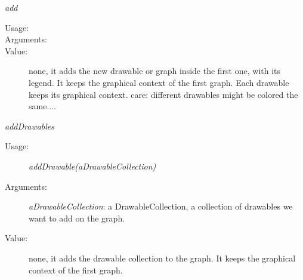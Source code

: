 \begin{description}
\begin{description}
  \item \textit{add}
    \begin{description}
    \item[Usage:] \rule{0pt}{1em}
    \item[Arguments:]  \rule{0pt}{1em}
    \item[Value:] none, it adds the new drawable or graph inside the first one, with its legend. It keeps the graphical context of the first graph. Each drawable keeps its graphical context. care: different drawables might be colored the same....
    \end{description}
    \bigskip

  \item \textit{addDrawables} \rule{0pt}{1em}
    \begin{description}
    \item[Usage:] \textit{addDrawable(aDrawableCollection)}
    \item[Arguments:] \textit{aDrawableCollection}: a DrawableCollection, a collection of drawables we want to add on the graph.
    \item[Value:] none, it adds the drawable collection to the graph. It keeps the graphical context of the first graph.
    \end{description}
    \bigskip


\end{description}
\end{description}
